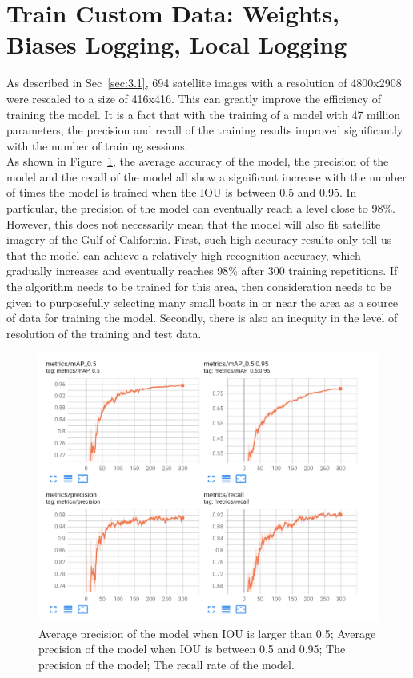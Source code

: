 \section{Train Custom Data: Weights, Biases Logging, Local Logging}
As described in Sec~\ref{sec:3.1}, 694 satellite images with a resolution of 4800x2908 were rescaled to a size of 416x416. This can greatly improve the efficiency of training the model. It is a fact that with the training of a model with 47 million parameters, the precision and recall of the training results improved significantly with the number of training sessions. \\

As shown in Figure~\ref{fig:colab_metrics}, the average accuracy of the model, the precision of the model and the recall of the model all show a significant increase with the number of times the model is trained when the IOU is between 0.5 and 0.95. In particular, the precision of the model can eventually reach a level close to 98\%. \\

However, this does not necessarily mean that the model will also fit satellite imagery of the Gulf of California. First, such high accuracy results only tell us that the model can achieve a relatively high recognition accuracy, which gradually increases and eventually reaches 98\% after 300 training repetitions. If the algorithm needs to be trained for this area, then consideration needs to be given to purposefully selecting many small boats in or near the area as a source of data for training the model. Secondly, there is also an inequity in the level of resolution of the training and test data. \\

\begin{figure}[h]
    \centering
    \includegraphics[scale=0.6]{img/colab_metrics.png}
    \caption{Average precision of the model when IOU is larger than 0.5; Average precision of the model when IOU is between 0.5 and 0.95; The precision of the model; The recall rate of the model.}
    \label{fig:colab_metrics}
\end{figure}

